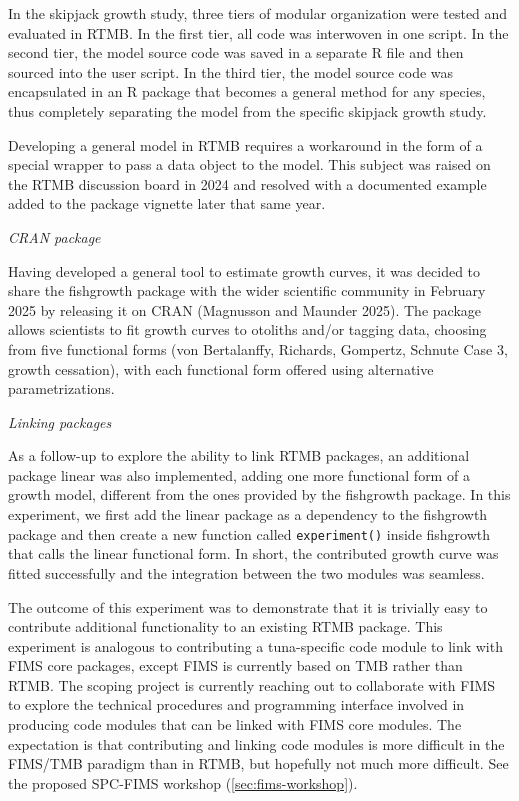 \documentclass{SCreport}
\begin{document}
In the skipjack growth study, three tiers of modular organization were tested
and evaluated in RTMB. In the first tier, all code was interwoven in one script.
In the second tier, the model source code was saved in a separate R file and
then sourced into the user script. In the third tier, the model source code was
encapsulated in an R package that becomes a general method for any species, thus
completely separating the model from the specific skipjack growth study.

Developing a general model in RTMB requires a workaround in the form of a
special wrapper to pass a data object to the model. This subject was raised on
the RTMB discussion board in 2024 and resolved with a documented example added
to the package vignette later that same year.

\vspace{2ex}

\textit{CRAN package}

Having developed a general tool to estimate growth curves, it was decided to
share the \textsf{fishgrowth} package with the wider scientific community in
February 2025 by releasing it on CRAN (Magnusson and Maunder 2025). The package
allows scientists to fit growth curves to otoliths and/or tagging data, choosing
from five functional forms (von Bertalanffy, Richards, Gompertz, Schnute Case 3,
growth cessation), with each functional form offered using alternative
parametrizations.

\newpage

\textit{Linking packages}

As a follow-up to explore the ability to link RTMB packages, an additional
package \textsf{linear} was also implemented, adding one more functional form of
a growth model, different from the ones provided by the \textsf{fishgrowth}
package. In this experiment, we first add the \textsf{linear} package as a
dependency to the \textsf{fishgrowth} package and then create a new function
called \texttt{experiment()} inside \textsf{fishgrowth} that calls the
\textsf{linear} functional form. In short, the contributed growth curve was
fitted successfully and the integration between the two modules was seamless.

The outcome of this experiment was to demonstrate that it is trivially easy to
contribute additional functionality to an existing RTMB package. This experiment
is analogous to contributing a tuna-specific code module to link with FIMS core
packages, except FIMS is currently based on TMB rather than RTMB. The scoping
project is currently reaching out to collaborate with FIMS to explore the
technical procedures and programming interface involved in producing code
modules that can be linked with FIMS core modules. The expectation is that
contributing and linking code modules is more difficult in the FIMS/TMB paradigm
than in RTMB, but hopefully not much more difficult. See the proposed SPC-FIMS
workshop (\autoref{sec:fims-workshop}).
\end{document}
